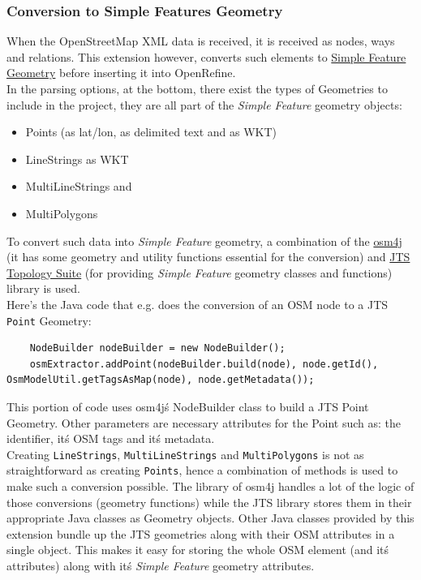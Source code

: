 \subsubsection{Conversion to Simple Features Geometry}\label{sec:conversion-to-simple-features-geometry}
When the OpenStreetMap XML data is received, it is received as nodes, ways and relations. This extension however, converts such
elements to \href{https://www.ogc.org/standards/sfa}{Simple Feature Geometry} before inserting it into OpenRefine.\\
\newline
In the parsing options, at the bottom, there exist the types of Geometries to include in the project, they are all part of the \textit{Simple Feature} geometry objects:
\begin{itemize}
    \item Points (as lat/lon, as delimited text and as WKT)
    \item LineStrings as WKT
    \item MultiLineStrings and
    \item MultiPolygons
\end{itemize}
To convert such data into \textit{Simple Feature} geometry, a combination of the \href{https://github.com/topobyte/osm4j}{osm4j}
(it has some geometry and utility functions essential for the conversion) and
\href{https://github.com/locationtech/jts}{JTS Topology Suite} (for providing \textit{Simple Feature} geometry classes and functions) library is used.\\
\newline
Here's the Java code that e.g. does the conversion of an OSM node to a JTS \texttt{Point} Geometry:
\begin{verbatim}
    NodeBuilder nodeBuilder = new NodeBuilder();
    osmExtractor.addPoint(nodeBuilder.build(node), node.getId(), OsmModelUtil.getTagsAsMap(node), node.getMetadata());
\end{verbatim}
This portion of code uses osm4j\'s NodeBuilder class to build a JTS Point Geometry. Other parameters are necessary attributes for the Point such as:
the identifier, it\'s OSM tags and it\'s metadata.\\
\newline
Creating \texttt{LineStrings}, \texttt{MultiLineStrings} and \texttt{MultiPolygons} is not
as straightforward as creating \texttt{Points}, hence a combination of methods is used to make such a conversion possible.
The library of osm4j handles a lot of the logic of those conversions (geometry functions) while the JTS library stores
them in their appropriate Java classes as Geometry objects. Other Java classes provided by this extension bundle up the JTS geometries along
with their OSM attributes in a single object. This makes it easy for storing the whole OSM element (and it\'s attributes)
along with it\'s \textit{Simple Feature} geometry attributes.
